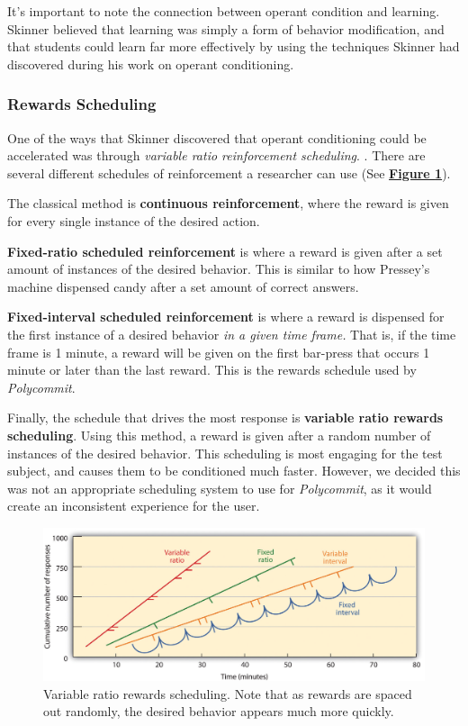 \par It's important to note the connection between operant condition and learning. Skinner believed that learning was simply a form of behavior modification, and that students could learn far more effectively by using the techniques Skinner had discovered during his work on operant conditioning.

\subsubsection{Rewards Scheduling}
 One of the ways that Skinner discovered that operant conditioning could be accelerated was through \textit{variable ratio reinforcement scheduling}. \cite{ferster1957schedules}. There are several different schedules of reinforcement a researcher can use (See \textbf{\hyperref[fig:variable_ratio]{Figure \ref*{fig:variable_ratio}}}).
 
 \par The classical method is \textbf{continuous reinforcement}, where the reward is given for every single instance of the desired action. 
 
 \par \textbf{Fixed-ratio scheduled reinforcement} is where a reward is given after a set amount of instances of the desired behavior. This is similar to how Pressey's machine dispensed candy after a set amount of correct answers. 
 
 \par \textbf{Fixed-interval scheduled reinforcement} is where a reward is dispensed for the first instance of a desired behavior \textit{in a given time frame.} That is, if the time frame is 1 minute, a reward will be given on the first bar-press that occurs 1 minute or later than the last reward. This is the rewards schedule used by \textit{Polycommit}.
 
 \par Finally, the schedule that drives the most response is \textbf{variable ratio rewards scheduling}. Using this method, a reward is given after a random number of instances of the desired behavior. This scheduling is most engaging for the test subject, and causes them to be conditioned much faster. However, we decided this was not an appropriate scheduling system to use for \textit{Polycommit}, as it would create an inconsistent experience for the user.
 
 
 \begin{figure}[h]
 	\includegraphics[width=1.0\linewidth]{figures/variable_ratio}
 	\caption{Variable ratio rewards scheduling. Note that as rewards are spaced out randomly, the desired behavior appears much more quickly.}
 	\label{fig:variable_ratio}
 \end{figure}

